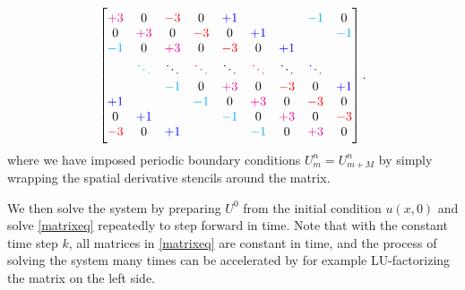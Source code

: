 \begin{equation*}
\begin{bmatrix}
\color{magenta} +3      & 0           & \color{red} -3      & 0           & \color{blue} +1      &             &             & \color{cyan} -1      & 0           \\
0           & \color{magenta} +3      & 0           & \color{red} -3      & 0           & \color{blue} +1      &             &             & \color{cyan} -1      \\
\color{cyan} -1      & 0           & \color{magenta} +3      & 0           & \color{red} -3      & 0           & \color{blue} +1      &             &             \\
            & \color{cyan} \ddots  & \ddots      & \color{magenta} \ddots  & \ddots      & \color{red} \ddots  & \ddots      & \color{blue} \ddots  &             \\
            &             & \color{cyan} -1      & 0           & \color{magenta} +3      & 0           & \color{red} -3      & 0           & \color{blue} +1      \\
\color{blue} +1      &             &             & \color{cyan} -1      & 0           & \color{magenta} +3      & 0           & \color{red} -3      & 0           \\
0           & \color{blue} +1      &             &             & \color{cyan} -1      & 0           & \color{magenta} +3      & 0           & \color{red} -3      \\
\color{red} -3      & 0           & \color{blue} +1      &             &             & \color{cyan} -1      & 0           & \color{magenta} +3      & 0           \\
\end{bmatrix}
.
\end{equation*}
where we have imposed periodic boundary conditions $U_m^n = U_{m+M}^n$ by simply wrapping the spatial derivative stencils around the matrix.

We then solve the system by preparing $U^0$ from the initial condition $u(x, 0)$ and solve \cref{matrixeq} repeatedly to step forward in time.
Note that with the constant time step $k$, all matrices in \cref{matrixeq} are constant in time, and the process of solving the system many times can be accelerated by for example LU-factorizing the matrix on the left side.

